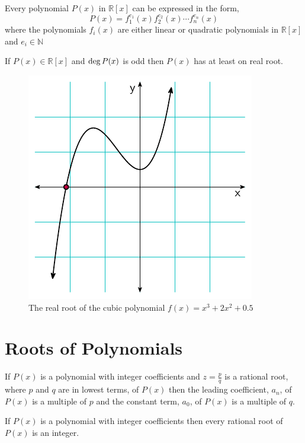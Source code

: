 \begin{corollary}
    Every polynomial $P(x)$ in $\mathbb{R}[x]$ can be expressed in the form,
    \[
        P(x) = f_{1}^{e_{1}}(x) f_{2}^{e_{2}}(x) \cdots f_{n}^{e_{n}}(x)
    \]
    where the polynomials $f_{i}(x)$ are either linear or quadratic polynomials in $\mathbb{R}[x]$ 
    and $e_{i} \in \mathbb{N}$
\end{corollary}

\begin{corollary}
    If $P(x) \in \mathbb{R}[x]$ and $\operatorname{deg} P(x)$ is odd then $P(x)$ has at least on real root.
\end{corollary}

\begin{figure}[!htpb]
\centering
\includegraphics[scale=1]{polynomials/figures/cubic_with_one_real_root}
\caption{The real root of the cubic polynomial $f(x)=x^3+2x^2+0.5$}
\end{figure}

\section{Roots of Polynomials}
\begin{theorem}
    If $P(x)$ is a polynomial with integer coefficients and $z=\frac{p}{q}$ is a 
    rational root, where $p$ and $q$ are in lowest terms, of $P(x)$ then 
    the leading coefficient, $a_{n}$, of $P(x)$ is a multiple of $p$ and the 
    constant term, $a_{0}$, of $P(x)$ is a multiple of $q$. 
\end{theorem}
\begin{corollary}
    If $P(x)$ is a polynomial with integer coefficients then every rational 
    root of $P(x)$ is an integer.
\end{corollary}

